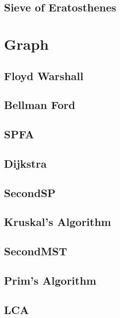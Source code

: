     \subsection{Sieve of Eratosthenes}
        

\section{Graph}
    \subsection{Floyd Warshall}
        
    \subsection{Bellman Ford}
        
    \subsection{SPFA}
        
    \subsection{Dijkstra}
         
    \subsection{SecondSP}
        
    \subsection{Kruskal's Algorithm}
        
    \subsection{SecondMST}
        
    \subsection{Prim's Algorithm}
        
    \subsection{LCA}
        
